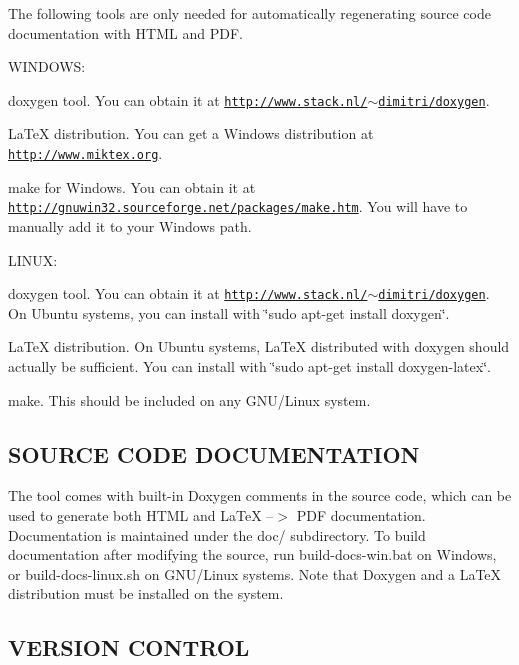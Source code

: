 The following tools are only needed for automatically regenerating source code documentation with H\-T\-M\-L and P\-D\-F.

W\-I\-N\-D\-O\-W\-S\-:


\begin{DoxyItemize}
\item doxygen tool. You can obtain it at \href{http://www.stack.nl/~dimitri/doxygen}{\tt http\-://www.\-stack.\-nl/$\sim$dimitri/doxygen}.
\item La\-Te\-X distribution. You can get a Windows distribution at \href{http://www.miktex.org}{\tt http\-://www.\-miktex.\-org}.
\item make for Windows. You can obtain it at \href{http://gnuwin32.sourceforge.net/packages/make.htm}{\tt http\-://gnuwin32.\-sourceforge.\-net/packages/make.\-htm}. You will have to manually add it to your Windows path.
\end{DoxyItemize}

L\-I\-N\-U\-X\-:


\begin{DoxyItemize}
\item doxygen tool. You can obtain it at \href{http://www.stack.nl/~dimitri/doxygen}{\tt http\-://www.\-stack.\-nl/$\sim$dimitri/doxygen}. On Ubuntu systems, you can install with \char`\"{}sudo apt-\/get install doxygen\char`\"{}.
\item La\-Te\-X distribution. On Ubuntu systems, La\-Te\-X distributed with doxygen should actually be sufficient. You can install with \char`\"{}sudo apt-\/get install doxygen-\/latex\char`\"{}.
\item make. This should be included on any G\-N\-U/\-Linux system. 

 \subsection*{S\-O\-U\-R\-C\-E C\-O\-D\-E D\-O\-C\-U\-M\-E\-N\-T\-A\-T\-I\-O\-N }
\end{DoxyItemize}

The tool comes with built-\/in Doxygen comments in the source code, which can be used to generate both H\-T\-M\-L and La\-Te\-X --$>$ P\-D\-F documentation. Documentation is maintained under the doc/ subdirectory. To build documentation after modifying the source, run build-\/docs-\/win.\-bat on Windows, or build-\/docs-\/linux.\-sh on G\-N\-U/\-Linux systems. Note that Doxygen and a La\-Te\-X distribution must be installed on the system. 

 \subsection*{V\-E\-R\-S\-I\-O\-N C\-O\-N\-T\-R\-O\-L }

